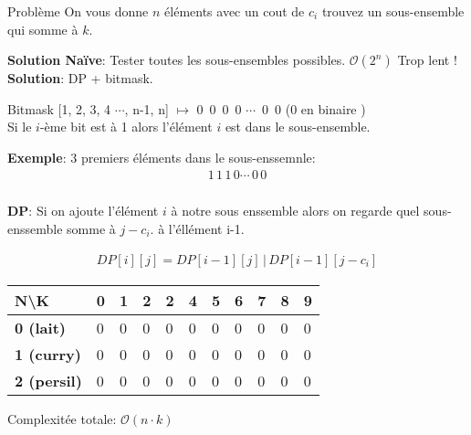 
\begin{frame}
    \frametitle{\problemtitle}
    \begin{block}
        {Problème} On vous donne $n$ éléments avec un cout de $c_i$ trouvez un sous-ensemble qui somme à $k$.
    \end{block}
    \pause
    \textbf{Solution Naïve}: Tester toutes les sous-ensembles possibles. $\mathcal O(2^n)$ Trop lent ! \\
    \pause
    \textbf{Solution}: DP + bitmask. \\
    \pause
    
    \begin{block}{Bitmask}
        [1, 2, 3, 4 $\cdots$, n-1, n] $\mapsto$ 0\, 0\, 0\, 0 $\cdots$\, 0\, 0 (0 en binaire ) \\
        Si le $i$-ème bit est à 1 alors l'élément $i$ est dans le sous-ensemble.
    \end{block}
    \pause
    \textbf{Exemple}: 3 premiers éléments dans le sous-enssemnle:\\
    \begin{align*}
        1\, 1\, 1\, 0 \cdots\, 0\, 0
    \end{align*}
    \pause
\end{frame}
\begin{frame}
    \frametitle{\problemtitle}
    \textbf{DP}: Si on ajoute l'élément $i$ à notre sous enssemble alors on regarde quel sous-enssemble somme à $j-c_i$. à l'éllément i-1.
    
    \begin{align*}
        DP[i][j] = DP[i-1][j] \,|\, DP[i-1][j-c_i]
    \end{align*}
    
    \begin{table}[]
      \begin{tabular}{|l|l|l|l|l|l|l|l|l|l|l|}
      \hline
      \textbf{N\textbackslash{}K} & \textbf{0} & \textbf{1} & \textbf{2} & \textbf{2} & \textbf{4} & \textbf{5} & \textbf{6} & \textbf{7} & \textbf{8} & \textbf{9} \\ \hline
      \textbf{0 (lait)}   & 0 & 0 & 0 & 0 & 0 & 0 & 0 & 0 & 0 & 0 \\ \hline
      \textbf{1 (curry)}  & 0 & 0 & 0 & 0 & 0 & 0 & 0 & 0 & 0 & 0 \\ \hline
      \textbf{2 (persil)} & 0 & 0 & 0 & 0 & 0 & 0 & 0 & 0 & 0 & 0 \\ \hline
      \end{tabular}
    \end{table}
    
    Complexitée totale: $\mathcal O(n \cdot k)$
\end{frame}
